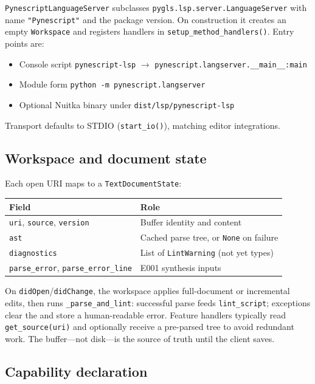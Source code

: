 \documentclass[11pt,a4paper]{article}
\begin{document}
\texttt{PynescriptLanguageServer} subclasses \texttt{pygls.lsp.server.LanguageServer}
with name \texttt{"Pynescript"} and the package version. On construction it creates an
empty \texttt{Workspace} and registers handlers in \texttt{setup\_method\_handlers()}.
Entry points are:
\begin{itemize}[leftmargin=*]
  \item Console script \texttt{pynescript-lsp} \(\rightarrow\)
        \texttt{pynescript.langserver.\_\_main\_\_:main}
  \item Module form \texttt{python -m pynescript.langserver}
  \item Optional Nuitka binary under \texttt{dist/lsp/pynescript-lsp}
\end{itemize}
Transport defaults to STDIO (\texttt{start\_io()}), matching editor integrations.

\subsection{Workspace and document state}
\label{sec:arch-workspace}

Each open URI maps to a \texttt{TextDocumentState}:
\begin{center}
\small
\begin{tabular}{ll}
\toprule
Field & Role \\
\midrule
\texttt{uri}, \texttt{source}, \texttt{version} & Buffer identity and content \\
\texttt{ast} & Cached parse tree, or \texttt{None} on failure \\
\texttt{diagnostics} & List of \texttt{LintWarning} (not yet \lsp{} types) \\
\texttt{parse\_error}, \texttt{parse\_error\_line} & E001 synthesis inputs \\
\bottomrule
\end{tabular}
\end{center}
On \texttt{didOpen}/\texttt{didChange}, the workspace applies full-document or
incremental edits, then runs \texttt{\_parse\_and\_lint}: successful parse feeds
\texttt{lint\_script}; exceptions clear the \ast{} and store a human-readable error.
Feature handlers typically read \texttt{get\_source(uri)} and optionally receive a
pre-parsed tree to avoid redundant work. The buffer---not disk---is the source of
truth until the client saves.

\subsection{Capability declaration}
\label{sec:arch-caps}
\end{document}
